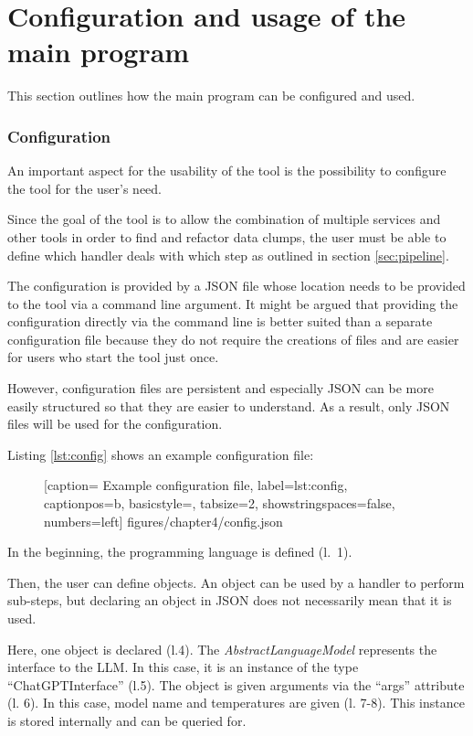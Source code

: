 \section{Configuration and usage of the main program}\label{sec:config}
This section outlines how the main program can be configured and used.

\subsubsection{Configuration}
An important aspect for the usability of the tool is the possibility to configure the tool for the user's need. 

Since the goal of the tool is to allow the combination of multiple services and other tools in order to find and refactor data clumps, the user must be able to define which handler deals with which step  as outlined in section \ref{sec:pipeline}.

The configuration is provided by a \ac{JSON} file whose location needs to be provided to the tool via a command line argument. It might be argued that providing the configuration directly via the command line is better suited than a separate configuration file because they do not require the creations of files and are easier for users who start the tool just once.

However, configuration files are persistent and especially \ac{JSON} can be more easily structured so that they are easier to understand. As a result, only \ac{JSON} files will be used  for the configuration. 


Listing \ref{lst:config} shows an example configuration file:
  \begin{figure} [htbp!]
			
			[caption={ Example configuration file},
			label={lst:config},
			captionpos=b, basicstyle=\footnotesize, tabsize=2, showstringspaces=false,  numbers=left]
			{figures/chapter4/config.json}
		\end{figure}


In the beginning, the programming language is defined (l.~1). 

Then, the user can define objects. An object can be used by a handler to perform sub-steps, but declaring an object in \ac{JSON} does not necessarily mean that it is used. 

Here, one object is declared (l.4). The \textit{AbstractLanguageModel} represents the interface to the \ac{LLM}. In this case, it is an instance of the type \enquote{ChatGPTInterface} (l.5). The object is given arguments via the \enquote{args} attribute (l. 6). In this case, model name and temperatures are given (l. 7-8).  This instance is stored internally and can be queried for.   

